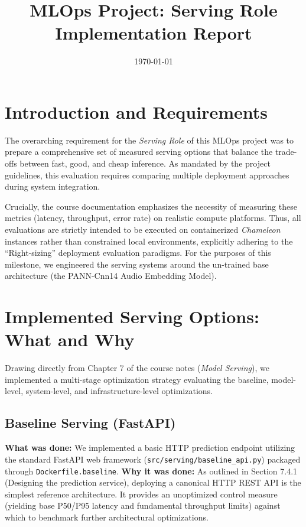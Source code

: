 \documentclass{article}
\title{MLOps Project: Serving Role Implementation Report}
\author{}
\date{\today}
\begin{document}
\maketitle

\section{Introduction and Requirements}
The overarching requirement for the \textit{Serving Role} of this MLOps project was to prepare a comprehensive set of measured serving options that balance the trade-offs between fast, good, and cheap inference. As mandated by the project guidelines, this evaluation requires comparing multiple deployment approaches during system integration. 

Crucially, the course documentation emphasizes the necessity of measuring these metrics (latency, throughput, error rate) on realistic compute platforms. Thus, all evaluations are strictly intended to be executed on containerized \textit{Chameleon} instances rather than constrained local environments, explicitly adhering to the ``Right-sizing'' deployment evaluation paradigms. For the purposes of this milestone, we engineered the serving systems around the un-trained base architecture (the PANN-Cnn14 Audio Embedding Model).

\section{Implemented Serving Options: What and Why}

Drawing directly from Chapter 7 of the course notes (\textit{Model Serving}), we implemented a multi-stage optimization strategy evaluating the baseline, model-level, system-level, and infrastructure-level optimizations.

\subsection{Baseline Serving (FastAPI)}
\textbf{What was done:} We implemented a basic HTTP prediction endpoint utilizing the standard FastAPI web framework (\texttt{src/serving/baseline\_api.py}) packaged through \texttt{Dockerfile.baseline}.
\newline
\textbf{Why it was done:} As outlined in Section 7.4.1 (Designing the prediction service), deploying a canonical HTTP REST API is the simplest reference architecture. It provides an unoptimized control measure (yielding base P50/P95 latency and fundamental throughput limits) against which to benchmark further architectural optimizations.
\end{document}
